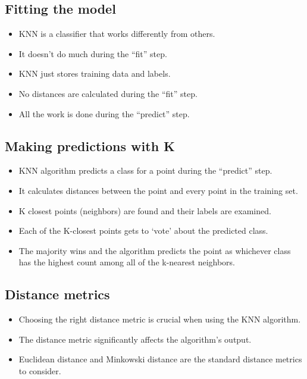 \documentclass[11pt]{article}
\providecommand{\tightlist}{%
      \setlength{\itemsep}{0pt}\setlength{\parskip}{0pt}}
\begin{document}
\hypertarget{fitting-the-model}{%
\subsection{Fitting the model}\label{fitting-the-model}}

\begin{itemize}
\tightlist
\item
  KNN is a classifier that works differently from others.
\item
  It doesn't do much during the ``fit'' step.
\item
  KNN just stores training data and labels.
\item
  No distances are calculated during the ``fit'' step.
\item
  All the work is done during the ``predict'' step.
\end{itemize}

\hypertarget{making-predictions-with-k}{%
\subsection{Making predictions with K}\label{making-predictions-with-k}}

\begin{itemize}
\tightlist
\item
  KNN algorithm predicts a class for a point during the ``predict''
  step.
\item
  It calculates distances between the point and every point in the
  training set.
\item
  K closest points (neighbors) are found and their labels are examined.
\item
  Each of the K-closest points gets to `vote' about the predicted class.
\item
  The majority wins and the algorithm predicts the point as whichever
  class has the highest count among all of the k-nearest neighbors.
\end{itemize}

\hypertarget{distance-metrics}{%
\subsection{Distance metrics}\label{distance-metrics}}

\begin{itemize}
\tightlist
\item
  Choosing the right distance metric is crucial when using the KNN
  algorithm.
\item
  The distance metric significantly affects the algorithm's output.
\item
  Euclidean distance and Minkowski distance are the standard distance
  metrics to consider.
\end{itemize}
\end{document}
